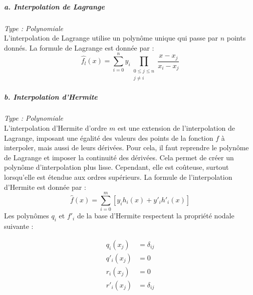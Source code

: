 \subparagraph{a. Interpolation de Lagrange \cite{Barycentric_Lagrange1, Barycentric_Lagrange2}}
\textit{Type : Polynomiale} \\
\phantom{----}L'interpolation de Lagrange utilise un polynôme unique qui passe par \(n\) points donnés. La formule de Lagrange est donnée par :
\begin{equation}
    \hat{f_l}(x) = \sum_{i=0}^{n} y_i \prod_{\substack{0 \leq j \leq n \\ j \neq i}} \frac{x - x_j}{x_i - x_j}
\end{equation}
\subparagraph{b. Interpolation d'Hermite \cite{bajaj}}
\textit{Type : Polynomiale} \\
\phantom{----}L'interpolation d'Hermite d'ordre \(m\) est une extension de l'interpolation de Lagrange, imposant une égalité des valeurs des points de la fonction \(f\) à interpoler, mais aussi de leurs dérivées. Pour cela, il faut reprendre le polynôme de Lagrange et imposer la continuité des dérivées. Cela permet de créer un polynôme d'interpolation plus lisse. Cependant, elle est coûteuse, surtout lorsqu'elle est étendue aux ordres supérieurs. La formule de l'interpolation d'Hermite est donnée par :
\begin{equation}
    \hat{f}(x) = \sum_{i=0}^{m} \left[ y_i h_i(x) + y'_i h'_i(x) \right]
\end{equation}
\vspace{-0,2 cm}
Les polynômes \( q_i \) et \( f'_i \) de la base d'Hermite respectent la propriété nodale suivante :

\vspace{-0,2 cm}

\begin{equation}
    \begin{aligned}
        q_i(x_j) &= \delta_{ij} \\
        q'_i(x_j) &= 0 \\
        r_i(x_j) &= 0 \\
        r'_i(x_j) &= \delta_{ij}
    \end{aligned}
\end{equation}


